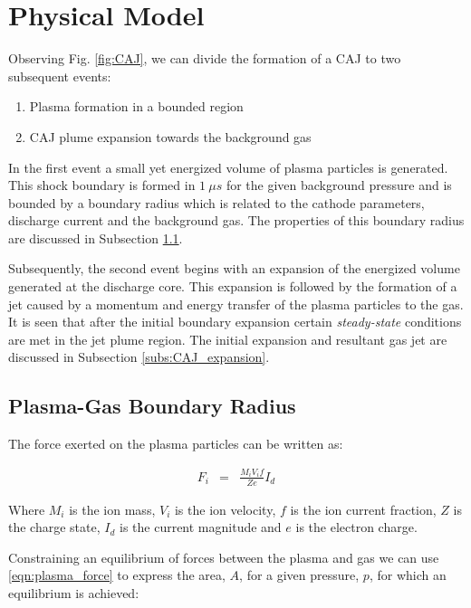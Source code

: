 \documentclass[a4paper]{iacas}%
\begin{document}
\section{Physical Model}\label{sec:physical_model}
Observing Fig. \ref{fig:CAJ}, we can divide the formation of a CAJ to two subsequent events:
\begin{enumerate}
	\item Plasma formation in a bounded region
	\item CAJ plume expansion towards the background gas
\end{enumerate}

In the first event a small yet energized volume of plasma particles is generated. This shock boundary is formed in $1~\mu s$ for the given background pressure \cite{meunier1987experimental} and is bounded by a boundary radius which is related to the cathode parameters, discharge current and the background gas. The properties of this boundary radius are discussed in Subsection \ref{subs:boundary_radius}. 

Subsequently, the second event begins with an expansion of the energized volume generated at the discharge core. This expansion is followed by the formation of a jet caused by a momentum and energy transfer of the plasma particles to the gas. It is seen that after the initial boundary expansion certain \textit{steady-state} conditions are met in the jet plume region. The initial expansion and resultant gas jet are discussed in Subsection \ref{subs:CAJ_expansion}. 

\subsection{Plasma-Gas Boundary Radius}\label{subs:boundary_radius}

The force exerted on the plasma particles can be written as:

\begin{eqnarray}\label{eqn:plasma_force}
	F_i &= &\frac{M_i V_i f}{Z e} I_d
\end{eqnarray}

Where $M_i$ is the ion mass, $V_i$ is the ion velocity, $f$ is the ion current fraction, $Z$ is the charge state, $I_d$ is the current magnitude and $e$ is the electron charge.

Constraining an equilibrium of forces between the plasma and gas we can use \eqref{eqn:plasma_force} to express the area, $A$, for a given pressure, $p$, for which an equilibrium is achieved:
\end{document}
